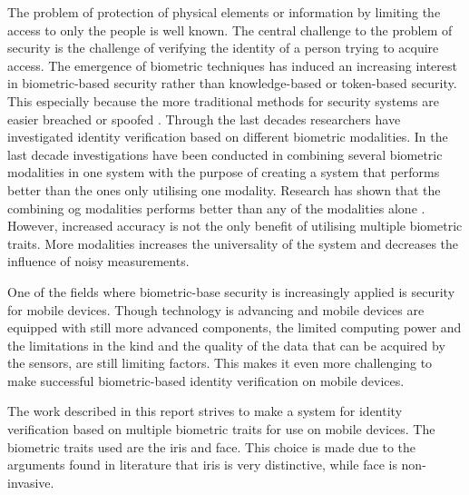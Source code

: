 The problem of protection of physical elements or information by limiting the access to only the people  is well known. The central challenge to the problem of security is the challenge of verifying the identity of a person trying to acquire access. The emergence of biometric techniques has induced an increasing interest in biometric-based security rather than knowledge-based or token-based security. This especially because the more traditional methods for security systems are easier breached or spoofed \citep{Ross2003}. Through the last decades researchers have investigated identity verification based on different biometric modalities. In the last decade investigations have been conducted in combining several biometric modalities in one system with the purpose of creating a system that performs better than the ones only utilising one modality. Research has shown that the combining og modalities performs better than any of the modalities alone \citep{Chen2005a}.  However, increased accuracy is not the only benefit of utilising multiple biometric traits. More modalities increases the universality of the system and decreases the influence of noisy measurements\citep{Ross2003}.

One of the fields where biometric-base security is increasingly applied is security for mobile devices. Though technology is advancing and mobile devices are equipped with still more advanced components, the limited computing power and the limitations in the kind and the quality of the data that can be acquired by the sensors, are still limiting factors. This makes it even more challenging to make successful biometric-based identity verification on mobile devices.

The work described in this report strives to make a system for identity verification based on multiple biometric traits for use on mobile devices. The biometric traits used are the iris and face. This choice is made due to the arguments found in literature that iris is very distinctive, while face is non-invasive\citep{Wang2009a}.